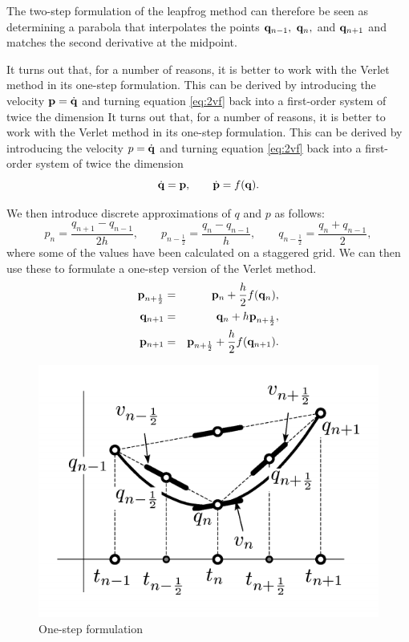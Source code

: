 The two-step formulation of the leapfrog method can therefore be seen as determining a parabola that interpolates the points ${\bf q}_{n-1},~{\bf q}_{n},$ and ${\bf q}_{n+1}$ and matches the second derivative at the midpoint.

It turns out that, for a number of reasons, it is better to work with the Verlet method in its one-step formulation. This can be derived by introducing the velocity ${\bf p}=\dot{\bf q}$ and turning equation \ref{eq:2vf} back into a first-order system of twice the dimension
It turns out that, for a number of reasons, it is better to work with the Verlet method in its one-step formulation. This can be derived by introducing the velocity $p=\dot{\bf q}$ and turning equation \ref{eq:2vf} back into a first-order system of twice the dimension
$$
	\dot{\bf q} = {\bf p},\qquad \dot{\bf p} = f({\bf q}).
$$

We then introduce discrete approximations of $q$ and $p$ as follows:
$$
p_n =\frac{q_{n+1}-q_{n-1}}{2h},\qquad p_{n-\frac12} = \frac{q_n-q_{n-1}}{h}, \qquad q_{n-\frac12} = \frac{q_n + q_{n-1}}{2},
$$
where some of the values have been calculated on a staggered grid. We can then use these to formulate a one-step version of the Verlet method. 
\begin{eqnarray*}
	{\bf p}_{n+\frac12} &=& {\bf p}_n+\frac{h}{2}f({\bf q}_n),\\
	{\bf q}_{n+1} &=& {\bf q}_n +h{\bf p}_{n+\frac12},\\
	{\bf p}_{n+1} &=& {\bf p}_{n+\frac12}+\frac{h}{2}f({\bf q}_{n+1}).
\end{eqnarray*}

\begin{figure}[H]
	\centering
	\includegraphics[scale=0.7]{onestep}
	\caption{One-step formulation}
\end{figure}

